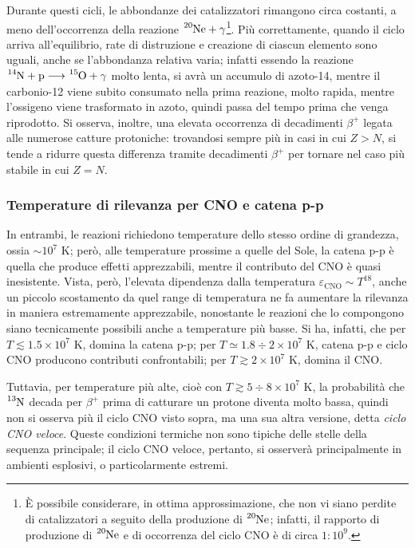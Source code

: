 \documentclass[11pt, a4paper]{scrartcl}
\theoremstyle{style}
\theoremstyle{style1}
\numberwithin{equation}{subsection}
\begin{document}
Durante questi cicli, le abbondanze dei catalizzatori rimangono circa costanti, a meno dell'occorrenza della reazione $\ce{^{20}Ne + \gamma}$\footnote{\`E possibile considerare, in ottima approssimazione, che non vi siano perdite di catalizzatori a seguito della produzione di $\ce{^{20}Ne}$; infatti, il rapporto di produzione di $\ce{^{20}Ne}$ e di occorrenza del ciclo CNO \`e di circa $1 : 10^9$.}.
Pi\`u correttamente, quando il ciclo arriva all'equilibrio, rate di distruzione e creazione di ciascun elemento sono uguali, anche se l'abbondanza relativa varia; infatti essendo la reazione $\ce{^{14}N + p} \longrightarrow \ce{^{15}O + \gamma}$ molto lenta, si avr\`a un accumulo di azoto-14, mentre il carbonio-12 viene subito consumato nella prima reazione, molto rapida, mentre l'ossigeno viene trasformato in azoto, quindi passa del tempo prima che venga riprodotto.
Si osserva, inoltre, una elevata occorrenza di decadimenti $\beta ^+$ legata alle numerose catture protoniche: trovandosi sempre pi\`u in casi in cui $Z > N$, si tende a ridurre questa differenza tramite decadimenti $\beta ^+$ per tornare nel caso pi\`u stabile in cui $Z= N$.
\subsubsection{Temperature di rilevanza per CNO e catena p-p}
In entrambi, le reazioni richiedono temperature dello stesso ordine di grandezza, ossia $\sim 10^7$ K; per\`o, alle temperature prossime a quelle del Sole, la catena p-p \`e quella che produce effetti apprezzabili, mentre il contributo del CNO \`e quasi inesistente. 
Vista, per\`o, l'elevata dipendenza dalla temperatura $\varepsilon _{\text{CNO}} \sim T^{18}$, anche un piccolo scostamento da quel range di temperatura ne fa aumentare la rilevanza in maniera estremamente apprezzabile, nonostante le reazioni che lo compongono siano tecnicamente possibili anche a temperature pi\`u basse.
Si ha, infatti, che per $T\lesssim 1.5\times 10^7$ K, domina la catena p-p; per $T\simeq 1.8\div 2 \times 10^7$ K, catena p-p e ciclo CNO producono contributi confrontabili; per $T\gtrsim 2\times 10^7$ K, domina il CNO.

Tuttavia, per temperature pi\`u alte, cio\`e con $T \gtrsim 5\div 8 \times 10^7$ K, la probabilit\`a che $\ce{^{13}N}$ decada per $\beta ^+$ prima di catturare un protone diventa molto bassa, quindi non si osserva pi\`u il ciclo CNO visto sopra, ma una sua altra versione, detta \textit{ciclo CNO veloce}.
Queste condizioni termiche non sono tipiche delle stelle della sequenza principale; il ciclo CNO veloce, pertanto, si osserver\`a principalmente in ambienti esplosivi, o particolarmente estremi.
\end{document}
